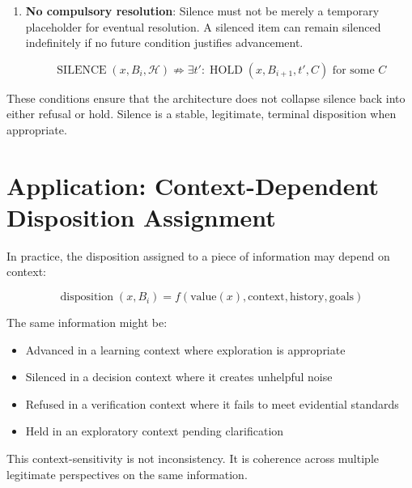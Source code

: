 \documentclass[12pt]{article}
\begin{document}
\begin{theorem}
\begin{enumerate}
\begin{equation}
\operatorname{SILENCE}(x, B_i, \mathcal{H}) \Rightarrow \text{condition}(x, B_i) \text{ is remonitorable}
\end{equation}

\item \textbf{No compulsory resolution}: Silence must not be merely a temporary placeholder for eventual resolution. A silenced item can remain silenced indefinitely if no future condition justifies advancement.

\begin{equation}
\operatorname{SILENCE}(x, B_i, \mathcal{H}) \not\Rightarrow \exists t' : \operatorname{HOLD}(x, B_{i+1}, t', C) \text{ for some } C
\end{equation}

\end{enumerate}

\end{theorem}

These conditions ensure that the architecture does not collapse silence back into either refusal or hold. Silence is a stable, legitimate, terminal disposition when appropriate.

\section{Application: Context-Dependent Disposition Assignment}

In practice, the disposition assigned to a piece of information may depend on context:

\begin{equation}
\operatorname{disposition}(x, B_i) = f(\text{value}(x), \text{context}, \text{history}, \text{goals})
\end{equation}

The same information might be:
\begin{itemize}
\item Advanced in a learning context where exploration is appropriate
\item Silenced in a decision context where it creates unhelpful noise
\item Refused in a verification context where it fails to meet evidential standards
\item Held in an exploratory context pending clarification
\end{itemize}

This context-sensitivity is not inconsistency. It is coherence across multiple legitimate perspectives on the same information.
\end{document}
